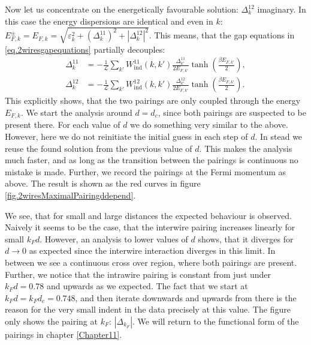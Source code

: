Now let us concentrate on the energetically favourable solution: $\Delta^{12}_k$ imaginary. In this case the energy dispersions are identical and even in $k$: $E^{\pm}_{F,k} = E_{F,k} = \sqrt{\varepsilon_k^2 + (\Delta^{11}_k)^2 + |\Delta^{12}_k|^2}$. This means, that the gap equations in \eqref{eq.2wiresgapequations} partially decouples: 
\begin{align}
\Delta^{11}_k &= -\frac{1}{\mathcal{L}}\sum_{k'} W_{\text{ind}}^{11}(k, k')\frac{\Delta^{11}_{k'}}{2E_{F,k'}}\tanh\left(\frac{\beta E_{F,k'}}{2}\right), \nonumber \\
\Delta^{12}_k &= -\frac{1}{\mathcal{L}}\sum_{k'} W_{\text{ind}}^{12}(k, k')\frac{\Delta^{12}_{k'}}{2E_{F,k'}}\tanh\left(\frac{\beta E_{F,k'}}{2}\right).
\label{eq.2wiresgapequationsDelta12imaginary}
\end{align} 
This explicitly shows, that the two pairings are only coupled through the energy $E_{F,k}$. We start the analysis around $d = d_c$, since both pairings are suspected to be present there. For each value of $d$ we do something very similar to the above. However, here we do not reinitiate the initial guess in each step of $d$. In stead we reuse the found solution from the previous value of $d$. This makes the analysis much faster, and as long as the transition between the pairings is continuous no mistake is made. Further, we record the pairings at the Fermi momentum as above. The result is shown as the red curves in figure \ref{fig.2wiresMaximalPairingddepend}.
 
We see, that for small and large distances the expected behaviour is observed. Naively it seems to be the case, that the interwire pairing increases linearly for small $k_Fd$. However, an analysis to lower values of $d$ shows, that it diverges for $d \to 0$ as expected since the interwire interaction diverges in this limit. In between we see a continuous cross over region, where both pairings are present. Further, we notice that the intrawire pairing is constant from just under $k_Fd = 0.78$ and upwards as we expected. The fact that we start at $k_Fd = k_Fd_c = 0.748$, and then iterate downwards and upwards from there is the reason for the very small indent in the data precisely at this value. The figure only shows the pairing at $k_F$: $|\Delta_{k_F}|$. We will return to the functional form of the pairings in chapter \ref{Chapter11}.


